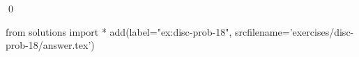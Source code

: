 
\begin{ex} 
  \label{ex:disc-prob-18}
  
  \qed
\end{ex} 
\begin{python0}
from solutions import *
add(label="ex:disc-prob-18",
    srcfilename='exercises/disc-prob-18/answer.tex') 
\end{python0}
